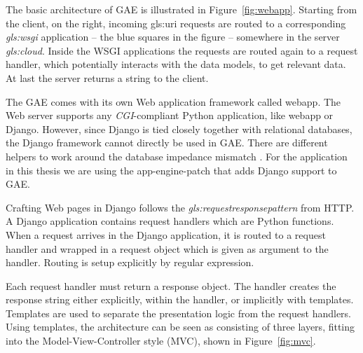 
The basic architecture of GAE is illustrated in Figure~\ref{fig:webapp}. Starting
from the client, on the right, incoming \gls{gls:uri} requests are routed to a
corresponding \textit{\gls{gls:wsgi}} application -- the blue squares in the
figure -- somewhere in the server \textit{\gls{gls:cloud}}. Inside the WSGI
applications the requests are routed again to a request handler, which
potentially interacts with the data models, to get relevant data. At last the
server returns a string to the client.

The GAE comes with its own Web application framework called webapp. The Web
server supports any \textit{CGI}-compliant Python application, like webapp or
Django. However, since Django is tied closely together with relational databases,
the Django framework cannot directly be used in GAE. There are different helpers
to work around the database impedance mismatch
\citep{Google:djangohelper,GAE:djangopatch}. For the application in this thesis
we are using the app-engine-patch that adds Django support to GAE.

Crafting Web pages in Django follows the
\textit{\gls{gls:requestresponsepattern}} from HTTP. A Django application
contains request handlers which are Python functions. When a request arrives in
the Django application, it is routed to a request handler and wrapped in a
request object which is given as argument to the handler. Routing is setup
explicitly by regular expression.

Each request handler must return a response object. The handler creates the
response string either explicitly, within the handler, or implicitly with
templates. Templates are used to separate the presentation logic from the request
handlers. Using templates, the architecture can be seen as consisting of three
layers, fitting into the Model-View-Controller style (MVC), shown
in Figure~\ref{fig:mvc}.

